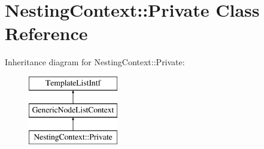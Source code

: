 \hypertarget{class_nesting_context_1_1_private}{}\section{Nesting\+Context\+::Private Class Reference}
\label{class_nesting_context_1_1_private}
Inheritance diagram for Nesting\+Context\+::Private\+:\begin{figure}[H]
\begin{center}
\leavevmode
\includegraphics[height=3.000000cm]{class_nesting_context_1_1_private}
\end{center}
\end{figure}
